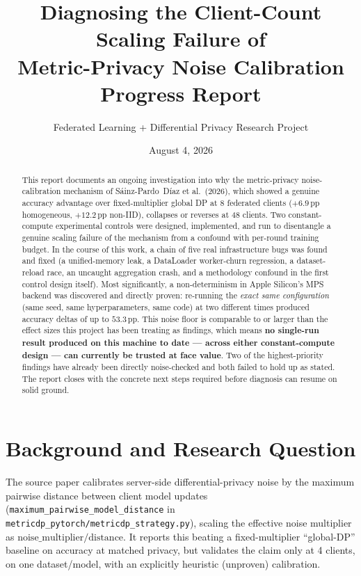 \documentclass[11pt]{article}
\title{\textbf{Diagnosing the Client-Count Scaling Failure of\\ Metric-Privacy Noise Calibration}\\[0.3em]
\large Progress Report}
\author{Federated Learning + Differential Privacy Research Project}
\date{August 4, 2026}
\newcommand{\code}[1]{\texttt{#1}}
\newcommand{\pp}{\,\text{pp}}
\begin{document}
\maketitle

\begin{abstract}
\noindent
This report documents an ongoing investigation into why the
metric-privacy noise-calibration mechanism of Sáinz-Pardo~Díaz et al.\ (2026), which showed a
genuine accuracy advantage over fixed-multiplier global DP at 8 federated clients
($+6.9\pp$ homogeneous, $+12.2\pp$ non-IID), collapses or reverses at 48 clients. Two
constant-compute experimental controls were designed, implemented, and run to disentangle a
genuine scaling failure of the mechanism from a confound with per-round training budget. In the
course of this work, a chain of five real infrastructure bugs was found and fixed (a unified-memory
leak, a DataLoader worker-churn regression, a dataset-reload race, an uncaught aggregation crash,
and a methodology confound in the first control design itself). Most significantly, a
non-determinism in Apple Silicon's MPS backend was discovered and directly proven: re-running the
\emph{exact same configuration} (same seed, same hyperparameters, same code) at two different times
produced accuracy deltas of up to $53.3\pp$. This noise floor is comparable to or larger than the
effect sizes this project has been treating as findings, which means \textbf{no single-run result
produced on this machine to date --- across either constant-compute design --- can currently be
trusted at face value}. Two of the highest-priority findings have already been directly
noise-checked and both failed to hold up as stated. The report closes with the concrete next steps
required before diagnosis can resume on solid ground.
\end{abstract}

\tableofcontents

\section{Background and Research Question}

The source paper calibrates server-side differential-privacy noise by the maximum pairwise distance
between client model updates (\code{maximum\_pairwise\_model\_distance} in
\code{metricdp\_pytorch/metricdp\_strategy.py}), scaling the effective noise multiplier as
$\text{noise\_multiplier} / \text{distance}$. It reports this beating a fixed-multiplier ``global-DP''
baseline on accuracy at matched privacy, but validates the claim only at 4 clients, on one
dataset/model, with an explicitly heuristic (unproven) calibration.
\end{document}
